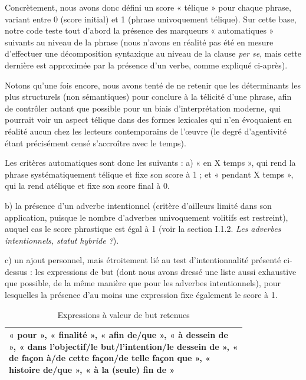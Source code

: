 Concrètement, nous avons donc défini un score « télique » pour chaque phrase, variant entre 0 (score initial) et 1 (phrase univoquement télique). Sur cette base, notre code teste tout d'abord la présence des marqueurs « automatiques » suivants au niveau de la phrase (nous n'avons en réalité pas été en mesure d'effectuer une décomposition syntaxique au niveau de la clause \textit{per se}, mais cette dernière est approximée par la présence d'un verbe, comme expliqué ci-après).

Notons qu'une fois encore, nous avons tenté de ne retenir que les déterminants les plus structurels (non sémantiques) pour conclure à la télicité d'une phrase, afin de contrôler autant que possible pour un biais d'interprétation moderne, qui pourrait voir un aspect télique dans des formes lexicales qui n'en évoquaient en réalité aucun chez les lecteurs contemporains de l'œuvre (le degré d'agentivité étant précisément censé s'accroître avec le temps). 

Les critères automatiques sont donc les suivants : 
a) « en X temps », qui rend la phrase systématiquement télique et fixe son score à 1 ; et « pendant X temps », qui la rend atélique et fixe son score final à 0. 

b) la présence d'un adverbe intentionnel (critère d'ailleurs limité dans son application, puisque le nombre d'adverbes univoquement volitifs est restreint), auquel cas le score phrastique est égal à 1 (voir la section I.1.2. \textit{Les adverbes intentionnels, statut hybride ?}).

c) un ajout personnel, mais étroitement lié au test d'intentionnalité présenté ci-dessus : les expressions de but (dont nous avons dressé une liste aussi exhaustive que possible, de la même manière que pour les adverbes intentionnels), pour lesquelles la présence d'au moins une expression fixe également le score à 1.

\begin{table}[ht]
\caption{Expressions à valeur de but retenues}
\centering
\bigskip
\renewcommand{\arraystretch}{1.5} %
\begin{tabular}{|p{0.8\linewidth}|}
    \hline
    « pour », « finalité », « afin de/que », « à dessein de », « dans l’objectif/le but/l’intention/le dessein de », « de façon à/de cette façon/de telle façon que », « histoire de/que », « à la (seule) fin de »  \\
    \hline
\end{tabular}
 \label{Tab:adv_but}
\end{table}
\bigskip

